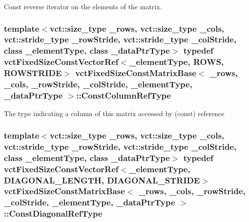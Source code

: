 Const reverse iterator on the elements of the matrix. \hypertarget{classvct_fixed_size_const_matrix_base_a68ed47f84a2855832fa0c18fafda6843}{
\subsubsection[{Const\-Column\-Ref\-Type}]{\setlength{\rightskip}{0pt plus 5cm}template$<$vct\-::size\-\_\-type \-\_\-rows, vct\-::size\-\_\-type \-\_\-cols, vct\-::stride\-\_\-type \-\_\-row\-Stride, vct\-::stride\-\_\-type \-\_\-col\-Stride, class \-\_\-element\-Type, class \-\_\-data\-Ptr\-Type$>$ typedef {\bf vct\-Fixed\-Size\-Const\-Vector\-Ref}$<$\-\_\-element\-Type, {\bf R\-O\-W\-S}, {\bf R\-O\-W\-S\-T\-R\-I\-D\-E}$>$ {\bf vct\-Fixed\-Size\-Const\-Matrix\-Base}$<$ \-\_\-rows, \-\_\-cols, \-\_\-row\-Stride, \-\_\-col\-Stride, \-\_\-element\-Type, \-\_\-data\-Ptr\-Type $>$\-::{\bf Const\-Column\-Ref\-Type}}}\label{classvct_fixed_size_const_matrix_base_a68ed47f84a2855832fa0c18fafda6843}
The type indicating a column of this matrix accessed by (const) reference \hypertarget{classvct_fixed_size_const_matrix_base_a54699d7dbe28072365fab4aa99c68d66}{
\subsubsection[{Const\-Diagonal\-Ref\-Type}]{\setlength{\rightskip}{0pt plus 5cm}template$<$vct\-::size\-\_\-type \-\_\-rows, vct\-::size\-\_\-type \-\_\-cols, vct\-::stride\-\_\-type \-\_\-row\-Stride, vct\-::stride\-\_\-type \-\_\-col\-Stride, class \-\_\-element\-Type, class \-\_\-data\-Ptr\-Type$>$ typedef {\bf vct\-Fixed\-Size\-Const\-Vector\-Ref}$<$\-\_\-element\-Type, {\bf D\-I\-A\-G\-O\-N\-A\-L\-\_\-\-L\-E\-N\-G\-T\-H}, {\bf D\-I\-A\-G\-O\-N\-A\-L\-\_\-\-S\-T\-R\-I\-D\-E}$>$ {\bf vct\-Fixed\-Size\-Const\-Matrix\-Base}$<$ \-\_\-rows, \-\_\-cols, \-\_\-row\-Stride, \-\_\-col\-Stride, \-\_\-element\-Type, \-\_\-data\-Ptr\-Type $>$\-::{\bf Const\-Diagonal\-Ref\-Type}}}\label{classvct_fixed_size_const_matrix_base_a54699d7dbe28072365fab4aa99c68d66}
